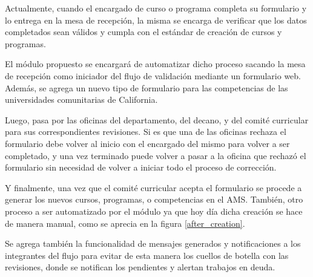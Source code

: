 Actualmente, cuando el encargado de curso o programa completa su formulario y lo entrega en la mesa de recepción, la misma se encarga de verificar que los datos completados sean válidos y cumpla con el estándar de creación de cursos y programas. 

El módulo propuesto se encargará de automatizar dicho proceso sacando la mesa de recepción como iniciador del flujo de validación mediante un formulario web. Además, se agrega un nuevo tipo de formulario para las competencias de las universidades comunitarias de California.

Luego, pasa por las oficinas del departamento, del decano, y del comité curricular para sus correspondientes revisiones. Si es que una de las oficinas rechaza el formulario debe volver al inicio con el encargado del mismo para volver a ser completado, y una vez terminado puede volver a pasar a la oficina que rechazó el formulario sin necesidad de volver a iniciar todo el proceso de corrección.

Y finalmente, una vez que el comité curricular acepta el formulario se procede a generar los nuevos cursos, programas, o competencias en el AMS. También, otro proceso a ser automatizado por el módulo ya que hoy día dicha creación se hace de manera manual, como se aprecia en la figura \ref{after_creation}.

Se agrega también la funcionalidad de mensajes generados y notificaciones a los integrantes del flujo para evitar de esta manera los cuellos de botella con las revisiones, donde se notifican los pendientes y alertan trabajos en deuda.



